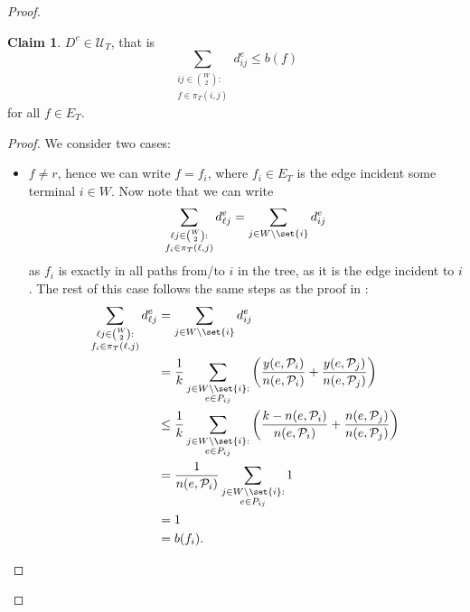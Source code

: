 \documentclass[11pt]{article}
\theoremstyle{definition}
\newtheorem{claim}{Claim}
\begin{document}
\begin{proof}
        \renewcommand\theclaim{1}
        \begin{claim}
            $D^e \in \mathcal U_T$, that is
            \[
                \sum_{\substack{ij \in \binom{W}{2}:\\f \in \pi_T(i,j)}} d^e_{ij} \le b(f)
            \]
            for all $f \in E_T$.
        \end{claim}
        \begin{proof}
            We consider two cases:
            \begin{itemize}
                \item $f \neq r$, hence we can write $f = f_i$, where $f_i \in E_T$ is the edge incident some terminal $i \in W$.
                Now note that we can write
                \[
                    \sum_{\substack{\ell j \in \binom{W}{2}:\\f_i \in \pi_T(\ell,j)}} d^e_{\ell j} = \sum_{j \in W \setminus \set{i}} d^e_{ij}
                \]
                as $f_i$ is exactly in all paths from/to $i$ in the tree, as it is the edge incident to $i$.
                The rest of this case follows the same steps as the proof in \cite{grandoni2008short}:
                \[
                    \begin{split}
                        \sum_{\substack{\ell j \in \binom{W}{2}:\\f_i \in \pi_T(\ell,j)}} d^e_{\ell j} &= \sum_{j \in W \setminus \set{i}} d^e_{ij} \\
                        &= \frac 1 k \sum_{\substack{j \in W \setminus \set{i}:\\ e \in P_{ij}}} \left( \frac{y(e, \mathcal P_i)}{n(e, \mathcal P_i)} + \frac{y(e, \mathcal P_j)}{n(e, \mathcal P_j)} \right) \\
                        &\le \frac 1 k \sum_{\substack{j \in W \setminus \set{i}:\\ e \in P_{ij}}} \left( \frac{k - n(e, \mathcal P_i)}{n(e, \mathcal P_i)} + \frac{n(e, \mathcal P_j)}{n(e, \mathcal P_j)} \right) \\
                        &= \frac{1}{n(e, \mathcal P_i)} \sum_{\substack{j \in W \setminus \set{i}:\\ e \in P_{ij}}} 1 \\
                        &= 1 \\
                        &= b(f_i).
                    \end{split}
                \]


\end{itemize}
\end{proof}
\end{proof}
\end{document}
